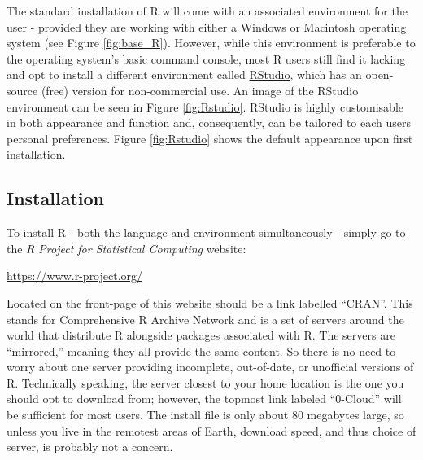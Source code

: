 The standard installation of R will come with an associated environment for the user - provided they are working with either a Windows or Macintosh operating system (see Figure \ref{fig:base_R}).  However, while this environment is preferable to the operating system's basic command console, most R users still find it lacking and opt to install a different environment called \href{https://posit.co/}{\gls{RStudio}}, which has an open-source (free) version for non-commercial use. An image of the RStudio environment can be seen in Figure \ref{fig:Rstudio}. RStudio is highly customisable in both appearance and function and, consequently, can be tailored to each users personal preferences. Figure \ref{fig:Rstudio} shows the default appearance upon first installation.

\subsection{Installation}
\label{sec:install}

To install R - both the language and environment simultaneously - simply go to the \textit{R Project for Statistical Computing} website: 

\begin{center}
\url{https://www.r-project.org/}
\end{center}

\noindent
Located on the front-page of this website should be a link labelled ``\acrshort{CRAN}''. This stands for \gls{Comprehensive R Archive Network} and is a set of servers around the world that distribute R alongside packages associated with R.  The servers are ``mirrored,'' meaning they all provide the same content.  So there is no need to worry about one server providing incomplete, out-of-date, or unofficial versions of R.  Technically speaking, the server closest to your home location is the one you should opt to download from; however, the topmost link labeled ``0-Cloud'' will be sufficient for most users.  The install file is only about 80 megabytes large, so unless you live in the remotest areas of Earth, download speed, and thus choice of server, is probably not a concern.

